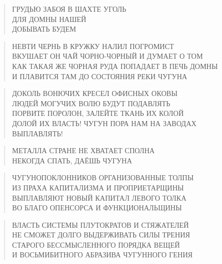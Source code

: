 \poemtitle{***}
\begin{verse}
ГРУДЬЮ ЗАБОЯ В ШАХТЕ УГОЛЬ\\
ДЛЯ ДОМНЫ НАШЕЙ\\
ДОБЫВАТЬ БУДЕМ
\end{verse}

\poemtitle{***}
\begin{verse}
НЕВТИ ЧЕРНЬ В КРУЖКУ НАЛИЛ ПОГРОМИСТ\\
ВКУШАЕТ ОН ЧАЙ ЧОРНО-ЧОРНЫЙ И ДУМАЕТ О ТОМ\\
КАК ТАКАЯ ЖЕ ЧОРНАЯ РУДА ПОПАДАЕТ В ПЕЧЬ ДОМНЫ\\
И ПЛАВИТСЯ ТАМ ДО СОСТОЯНИЯ РЕКИ ЧУГУНА
\end{verse}

\poemtitle{***}
\begin{verse}
ДОКОЛЬ ВОНЮЧИХ КРЕСЕЛ ОФИСНЫХ ОКОВЫ\\
ЛЮДЕЙ МОГУЧИХ ВОЛЮ БУДУТ ПОДАВЛЯТЬ\\
ПОРВИТЕ ПОРОЛОН, ЗАЛЕЙТЕ ТКАНЬ ИХ КОЛОЙ\\
ДОЛОЙ ИХ ВЛАСТЬ! ЧУГУН ПОРА НАМ НА ЗАВОДАХ ВЫПЛАВЛЯТЬ!
\end{verse}

\poemtitle{***}
\begin{verse}
МЕТАЛЛА СТРАНЕ НЕ ХВАТАЕТ СПОЛНА\\
НЕКОГДА СПАТЬ, ДАЁШЬ ЧУГУНА
\end{verse}

\poemtitle{***}
\begin{verse}
ЧУГУНОПОКЛОННИКОВ ОРГАНИЗОВАННЫЕ ТОЛПЫ\\
ИЗ ПРАХА КАПИТАЛИЗМА И ПРОПРИЕТАРЩИНЫ\\
ВЫПЛАВЛЯЮТ НОВЫЙ КАПИТАЛ ЛЕВОГО ТОЛКА\\
ВО БЛАГО ОПЕНСОРСА И ФУНКЦИОНАЛЬЩИНЫ
\end{verse}

\poemtitle{***}
\begin{verse}
ВЛАСТЬ СИСТЕМЫ ПЛУТОКРАТОВ И СТЯЖАТЕЛЕЙ\\
НЕ СМОЖЕТ ДОЛГО ВЫДЕРЖИВАТЬ СИЛЫ ТРЕНИЯ\\
СТАРОГО БЕССМЫСЛЕННОГО ПОРЯДКА ВЕЩЕЙ\\
И ВОСЬМИБИТНОГО АБРАЗИВА ЧУГУННОГО ГЕНИЯ
\end{verse}

